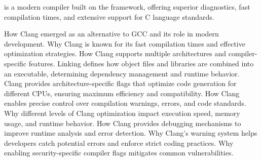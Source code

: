 \begin{NxSSSBox}
	\begin{NxIDBox}
		 is a modern compiler built on the  framework, offering superior diagnostics, fast compilation times, and extensive support for C language standards.
	\end{NxIDBox}
	\begin{NxIDBoxL}
		 How Clang emerged as an alternative to GCC and its role in modern development.
		 Why Clang is known for its fast compilation times and effective optimization strategies.
		 How Clang supports multiple architectures and compiler-specific features.
		 Linking defines how object files and libraries are combined into an executable, determining dependency management and runtime behavior.
		 Clang provides architecture-specific flags that optimize code generation for different CPUs, ensuring maximum efficiency and compatibility.
		 How Clang enables precise control over compilation warnings, errors, and code standards.
		 Why different levels of Clang optimization impact execution speed, memory usage, and runtime behavior.
		 How Clang provides debugging mechanisms to improve runtime analysis and error detection.
		 Why Clang’s warning system helps developers catch potential errors and enforce strict coding practices.
		 Why enabling security-specific compiler flags mitigates common vulnerabilities.
	\end{NxIDBoxL}
\end{NxSSSBox}

